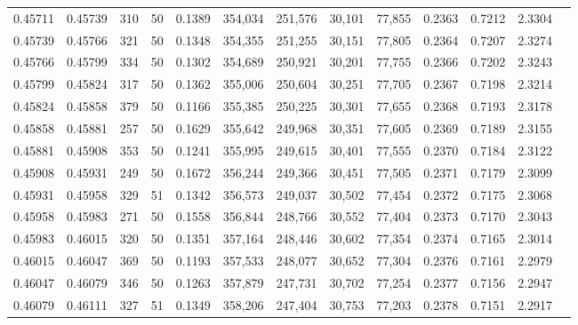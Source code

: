 \begin{tabular}{rrrrrrrrrrrrr}
0.45711 & 0.45739 &   310 &  50 &                                     0.1389 & 354,034 & 251,576 &  30,101 &  77,855 & 0.2363 & 0.7212 & 2.3304 \\
0.45739 & 0.45766 &   321 &  50 &                                     0.1348 & 354,355 & 251,255 &  30,151 &  77,805 & 0.2364 & 0.7207 & 2.3274 \\
0.45766 & 0.45799 &   334 &  50 &                                     0.1302 & 354,689 & 250,921 &  30,201 &  77,755 & 0.2366 & 0.7202 & 2.3243 \\
0.45799 & 0.45824 &   317 &  50 &                                     0.1362 & 355,006 & 250,604 &  30,251 &  77,705 & 0.2367 & 0.7198 & 2.3214 \\
0.45824 & 0.45858 &   379 &  50 &                                     0.1166 & 355,385 & 250,225 &  30,301 &  77,655 & 0.2368 & 0.7193 & 2.3178 \\
0.45858 & 0.45881 &   257 &  50 &                                     0.1629 & 355,642 & 249,968 &  30,351 &  77,605 & 0.2369 & 0.7189 & 2.3155 \\
0.45881 & 0.45908 &   353 &  50 &                                     0.1241 & 355,995 & 249,615 &  30,401 &  77,555 & 0.2370 & 0.7184 & 2.3122 \\
0.45908 & 0.45931 &   249 &  50 &                                     0.1672 & 356,244 & 249,366 &  30,451 &  77,505 & 0.2371 & 0.7179 & 2.3099 \\
0.45931 & 0.45958 &   329 &  51 &                                     0.1342 & 356,573 & 249,037 &  30,502 &  77,454 & 0.2372 & 0.7175 & 2.3068 \\
0.45958 & 0.45983 &   271 &  50 &                                     0.1558 & 356,844 & 248,766 &  30,552 &  77,404 & 0.2373 & 0.7170 & 2.3043 \\
0.45983 & 0.46015 &   320 &  50 &                                     0.1351 & 357,164 & 248,446 &  30,602 &  77,354 & 0.2374 & 0.7165 & 2.3014 \\
0.46015 & 0.46047 &   369 &  50 &                                     0.1193 & 357,533 & 248,077 &  30,652 &  77,304 & 0.2376 & 0.7161 & 2.2979 \\
0.46047 & 0.46079 &   346 &  50 &                                     0.1263 & 357,879 & 247,731 &  30,702 &  77,254 & 0.2377 & 0.7156 & 2.2947 \\
0.46079 & 0.46111 &   327 &  51 &                                     0.1349 & 358,206 & 247,404 &  30,753 &  77,203 & 0.2378 & 0.7151 & 2.2917 \\

\end{tabular}
